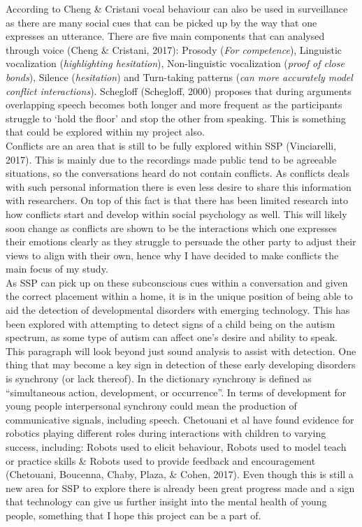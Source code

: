 \documentclass[a4paper,11pt]{report}
\begin{document}
According to Cheng \& Cristani vocal behaviour can also be used in surveillance as there are many social cues that can be picked up by the way that one expresses an utterance. There are five main components that can analysed through voice (Cheng \& Cristani, 2017): Prosody (\textit{For competence}), Linguistic vocalization (\textit{highlighting hesitation}), Non-linguistic vocalization (\textit{proof of close bonds}), Silence (\textit{hesitation}) and Turn-taking patterns (\textit{can more accurately model conflict interactions}). Schegloff (Schegloff, 2000) proposes that during arguments overlapping speech becomes both longer and more frequent as the participants struggle to ‘hold the floor’ and stop the other from speaking. This is something that could be explored within my project also.\\

Conflicts are an area that is still to be fully explored within SSP (Vinciarelli, 2017). This is mainly due to the recordings made public tend to be agreeable situations, so the conversations heard do not contain conflicts. As conflicts deals with such personal information there is even less desire to share this information with researchers. On top of this fact is that there has been limited research into how conflicts start and develop within social psychology as well. This will likely soon change as conflicts are shown to be the interactions which one expresses their emotions clearly as they struggle to persuade the other party to adjust their views to align with their own, hence why I have decided to make conflicts the main focus of my study. \\

As SSP can pick up on these subconscious cues within a conversation and given the correct placement within a home, it is in the unique position of being able to aid the detection of developmental disorders with emerging technology. This has been explored with attempting to detect signs of a child being on the autism spectrum, as some type of autism can affect one’s desire and ability to speak. This paragraph will look beyond just sound analysis to assist with detection. One thing that may become a key sign in detection of these early developing disorders is synchrony (or lack thereof). In the dictionary synchrony is defined as “simultaneous action, development, or occurrence”. In terms of development for young people interpersonal synchrony could mean the production of communicative signals, including speech. Chetouani et al have found evidence for robotics playing different roles during interactions with children to varying success, including: Robots used to elicit behaviour, Robots used to model teach or practice skills \& Robots used to provide feedback and encouragement (Chetouani, Boucenna, Chaby, Plaza, \& Cohen, 2017). Even though this is still a new area for SSP to explore there is already been great progress made and a sign that technology can give us further insight into the mental health of young people, something that I hope this project can be a part of.\\
\end{document}
